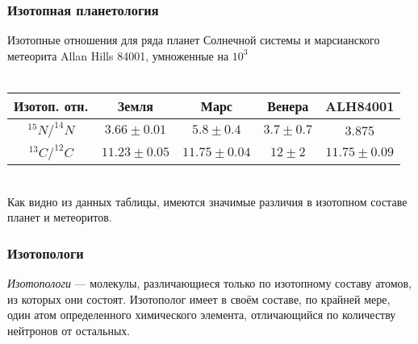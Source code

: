 \begin{frame}
\frametitle{Изотопная планетология}
Изотопные отношения для ряда планет Солнечной системы и марсианского метеорита Allan Hills 84001, умноженные на $10^3$\\
~\\
\begin{table}[h!]
	\begin{center}	
		\begin{tabular}{|c|cccc|}
			\hline 
			Изотоп. отн.  & Земля &  Марс  & Венера & ALH84001   \\
			\hline 
			$^{15}N / ^{14}N$ & $3.66 \pm 0.01$ & $5.8 \pm 0.4$ & $3.7 \pm 0.7$ & 3.875\\ [1mm]
			$^{13}C / ^{12}C$ & $11.23 \pm 0.05$ & $11.75 \pm 0.04$ & $12 \pm 2$ &  $11.75 \pm 0.09$ \\ [1mm]
			\hline 
		\end{tabular}
		\label{t:PlanetsIsotope}
	\end{center}
\end{table} 
~\\
Как видно из данных таблицы, имеются значимые различия в изотопном составе планет и метеоритов. 
\end{frame}


\begin{frame}
\frametitle{Изотопологи}

\emph{Изотопологи} --- молекулы, различающиеся только по изотопному составу атомов, из которых они состоят. Изотополог имеет в своём составе, по крайней мере, один атом определенного химического элемента, отличающийся по количеству нейтронов от остальных.

\end{frame}


